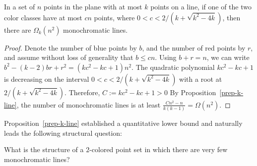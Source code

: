 \documentclass[a4paper,11pt,leqno]{article}
\begin{document}
\begin{corollary}\label{cor:prep-k-line}
In a set of $n$ points in the plane with at most $k$ points on a line, if one of the two color classes have at most $cn$ points, where $0 < c < 2/(k+\sqrt{k^2-4k})$, then there are $\Omega_k(n^2)$ monochromatic lines.
\end{corollary}
\begin{proof}
Denote the number of blue points by $b$, and the number of red points by $r$, and assume without loss of generality that $b\leq cn$.
Using $b+r=n$, we can write $b^2-(k-2)br+r^2 = (kc^2-kc+1)n^2$.
The quadratic polynomial $kc^2-kc+1$ is decreasing on the interval $0 < c < 2/(k+\sqrt{k^2-4k})$ with a root at $2/(k+\sqrt{k^2-4k})$.
Therefore, $C:=kc^2-kc+1 > 0$
By Proposition~\ref{prep-k-line}, the number of monochromatic lines is at least $\frac{Cn^2-n}{k(k-1)} = \Omega(n^2)$.
\end{proof}


Proposition~\ref{prep-k-line} established a quantitative lower bound and naturally leads the following structural question:


\begin{question}
What is the structure of a $2$-colored point set in which there are very few monochromatic lines?
\end{question}
\end{document}
